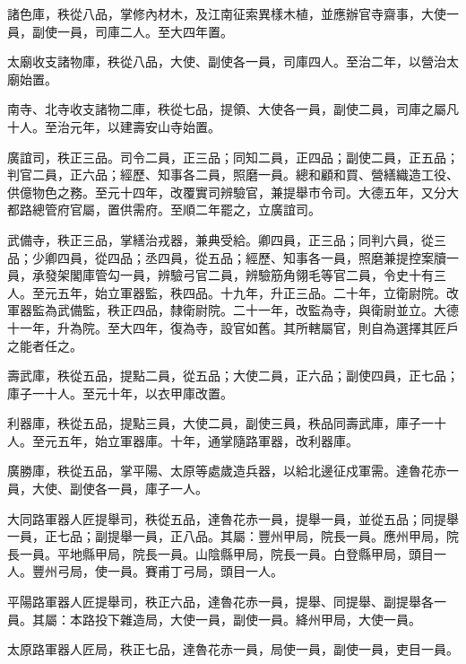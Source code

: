 \begin{pinyinscope}
 諸色庫，秩從八品，掌修內材木，及江南征索異樣木植，並應辦官寺齋事，大使一員，副使一員，司庫二人。至大四年置。



 太廟收支諸物庫，秩從八品，大使、副使各一員，司庫四人。至治二年，以營治太廟始置。



 南寺、北寺收支諸物二庫，秩從七品，提領、大使各一員，副使二員，司庫之屬凡十人。至治元年，以建壽安山寺始置。



 廣誼司，秩正三品。司令二員，正三品；同知二員，正四品；副使二員，正五品；判官二員，正六品；經歷、知事各二員，照磨一員。總和顧和買、營繕織造工役、供億物色之務。至元十四年，改覆實司辨驗官，兼提舉市令司。大德五年，又分大都路總管府官屬，置供需府。至順二年罷之，立廣誼司。



 武備寺，秩正三品，掌繕治戎器，兼典受給。卿四員，正三品；同判六員，從三品；少卿四員，從四品；丞四員，從五品；經歷、知事各一員，照磨兼提控案牘一員，承發架閣庫管勾一員，辨驗弓官二員，辨驗筋角翎毛等官二員，令史十有三人。至元五年，始立軍器監，秩四品。十九年，升正三品。二十年，立衛尉院。改軍器監為武備監，秩正四品，隸衛尉院。二十一年，改監為寺，與衛尉並立。大德十一年，升為院。至大四年，復為寺，設官如舊。其所轄屬官，則自為選擇其匠戶之能者任之。



 壽武庫，秩從五品，提點二員，從五品；大使二員，正六品；副使四員，正七品；庫子一十人。至元十年，以衣甲庫改置。



 利器庫，秩從五品，提點三員，大使二員，副使三員，秩品同壽武庫，庫子一十人。至元五年，始立軍器庫。十年，通掌隨路軍器，改利器庫。



 廣勝庫，秩從五品，掌平陽、太原等處歲造兵器，以給北邊征戍軍需。達魯花赤一員，大使、副使各一員，庫子一人。



 大同路軍器人匠提舉司，秩從五品，達魯花赤一員，提舉一員，並從五品；同提舉一員，正七品；副提舉一員，正八品。其屬：豐州甲局，院長一員。應州甲局，院長一員。平地縣甲局，院長一員。山陰縣甲局，院長一員。白登縣甲局，頭目一人。豐州弓局，使一員。賽甫丁弓局，頭目一人。



 平陽路軍器人匠提舉司，秩正六品，達魯花赤一員，提舉、同提舉、副提舉各一員。其屬：本路投下雜造局，大使一員，副使一員。絳州甲局，大使一員。



 太原路軍器人匠局，秩正七品，達魯花赤一員，局使一員，副使一員，吏目一員。




\end{pinyinscope}
